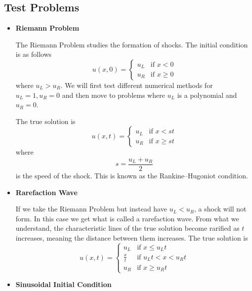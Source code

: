 \documentclass{myproject}
\begin{document}
\subsection{Test Problems}
\begin{itemize}
	\item \textbf{Riemann Problem}
	
    The Riemann Problem studies the formation of shocks. The initial condition is as follows
	\begin{equation}
		u(x,0) = 
	    \begin{cases}
	      	u_L & \text{if } x < 0 \\
			u_R & \text{if } x \geq 0
	    \end{cases}
	\end{equation}
	where $u_L > u_R$. We will first test different numerical methods for $u_L = 1, u_R = 0$ and then move to problems where $u_L$ is a polynomial and $u_R = 0$.
	
    The true solution is
	\begin{equation}
		u(x,t) = 
	    \begin{cases}
	      	u_L & \text{if } x < st \\
			u_R & \text{if } x \geq st
	    \end{cases}
	\end{equation}
	where \[s = \frac{u_L + u_R}{2}\] is the speed of the shock. This is known as the Rankine–Hugoniot condition.
	
	\item \textbf{Rarefaction Wave}
	
    If we take the Riemann Problem but instead have $u_L < u_R$, a shock will not form. In this case we get what is called a rarefaction wave. From what we understand, the characteristic lines of the true solution become rarified as $t$ increases, meaning the distance between them increases.
	The true solution is
	\begin{equation}
		u(x,t) = 
	    \begin{cases}
	      	u_L & \text{if } x \leq {u_L}t \\
			\frac{x}{t} & \text{if } {u_L}t < x < {u_R}t \\
			u_R & \text{if } x \geq {u_R}t
	    \end{cases}
	\end{equation}

	\item \textbf{Sinusoidal Initial Condition}


\end{itemize}
\end{document}
